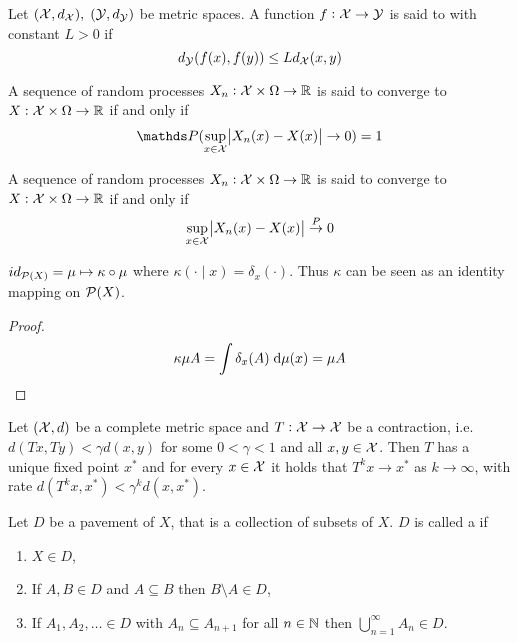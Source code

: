 \begin{defn}
  Let $(\mathcal{X}, d_\mathcal{X}), \; (\mathcal{Y}, d_\mathcal{Y})$ be metric spaces.
  A function $f: \mathcal{X} \to \mathcal{Y}$ is
  said to  with constant $L > 0$ if
  \[ d_\mathcal{Y}(f(x),f(y)) \leq L d_\mathcal{X}(x,y) \]
  \label{defn:Lipschitz}
\end{defn}

\begin{defn} 
  A sequence of random processes $X_n : \mathcal{X} \times \Omega \to \mathbb{R}$
  is said to converge  to $X: \mathcal{X} \times \Omega \to \mathbb{R}$ if and only if
  \[ \Prob(\sup_{x \in \Cal{X}} \abs{X_n(x) - X(x)} \to 0) = 1 \]
\end{defn}

\begin{defn} 
  A sequence of random processes $X_n: \mathcal{X} \times \Omega \to \mathbb{R}$
  is said to converge  to $X : \mathcal{X} \times \Omega \to \mathbb{R}$ if and only if
  \[ \sup_{x \in \mathcal{X}} \abs{X_n(x) - X(x)} \overset{P}{\to} 0 \]
\end{defn}

\begin{prop}
  $id_{\mathcal{P}(X)} = \mu \mapsto \kappa \circ \mu$
  where $\kappa(\cdot \mid x) = \delta_x(\cdot)$.
  Thus $\kappa$ can be seen as an identity mapping on $\mathcal{P}(X)$.
  \label{prop:identityKernel}
\end{prop}
\begin{proof}
  \[ \kappa \mu A = \int \delta_x(A) \; \mathrm{d} \mu(x) = \mu A \]
\end{proof}


\begin{thm}
  Let $(\mathcal{X}, d)$ be a complete metric space
  and $T:\mathcal{X} \to \mathcal{X}$ be a contraction,
  i.e. $d(Tx, Ty)<\gamma d(x, y)$ for some $0 < \gamma < 1$
  and all $x,y \in \mathcal{X}$.
  Then $T$ has a unique fixed point $x^*$ and for every $x\in \mathcal{X}$
  it holds that $T^k x \to x^*$ as $k \to \infty$, with rate
  $d(T^k x, x^*) < \gamma^k d(x, x^*)$.
  \label{thm:BanachFP}
\end{thm}

\begin{defn}
  Let $D$ be a pavement of $X$,
  that is a collection of subsets of $X$.
  $D$ is called a  if
  \begin{enumerate}
    \item $X \in D$,
    \item If $A, B \in D$ and $A \subseteq B$ then $B \setminus A \in D$,
    \item If $A_1, A_2, \dots \in D$ with $A_n \subseteq A_{n+1}$ for
      all $n \in \mathbb{N}$ then $\bigcup_{n=1}^\infty A_n \in D$.
  \end{enumerate}
  \label{defn:DynkinClass}
\end{defn}

